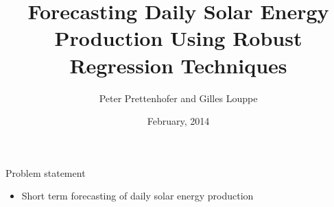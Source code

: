 \documentclass[handout]{beamer}
\title{Forecasting Daily Solar Energy Production Using Robust Regression Techniques}
\author{Peter Prettenhofer and Gilles Louppe}
\institute{Graz University of Technology, Austria\\
Université de Liège, Belgium}
\date{February, 2014}
\begin{document}

\begin{frame}
\titlepage
\end{frame}



\begin{frame}{Problem statement}
  \begin{itemize}
     \item Short term forecasting of daily solar energy production
  \end{itemize}
\end{frame}


\end{document}
